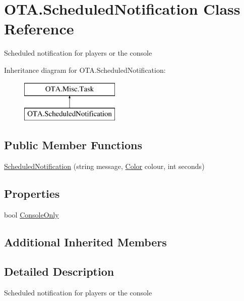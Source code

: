 \hypertarget{class_o_t_a_1_1_scheduled_notification}{}\section{O\+T\+A.\+Scheduled\+Notification Class Reference}
\label{class_o_t_a_1_1_scheduled_notification}


Scheduled notification for players or the console  


Inheritance diagram for O\+T\+A.\+Scheduled\+Notification\+:\begin{figure}[H]
\begin{center}
\leavevmode
\includegraphics[height=2.000000cm]{class_o_t_a_1_1_scheduled_notification}
\end{center}
\end{figure}
\subsection*{Public Member Functions}
\begin{DoxyCompactItemize}
\item 
\hyperlink{class_o_t_a_1_1_scheduled_notification_a84c38a1d6bb7b7cc09c8a1e90a48a136}{Scheduled\+Notification} (string message, \hyperlink{struct_microsoft_1_1_xna_1_1_framework_1_1_color}{Color} colour, int seconds)
\end{DoxyCompactItemize}
\subsection*{Properties}
\begin{DoxyCompactItemize}
\item 
bool \hyperlink{class_o_t_a_1_1_scheduled_notification_a967199fad8fb44892c460c900b3ca722}{Console\+Only}
\end{DoxyCompactItemize}
\subsection*{Additional Inherited Members}


\subsection{Detailed Description}
Scheduled notification for players or the console 



